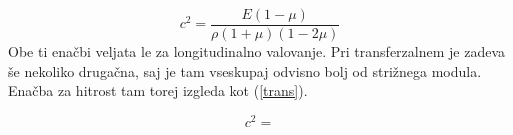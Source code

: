 \documentclass[10pt]{article}
\begin{document}
\begin{equation}
    c^{2} = \frac{E(1-\mu)}{\rho(1+\mu)(1-2\mu)}
    \label{razsežna}
\end{equation}
Obe ti enačbi veljata le za longitudinalno valovanje. Pri transferzalnem je zadeva še nekoliko drugačna, saj je tam vseskupaj odvisno bolj od strižnega modula. Enačba za hitrost tam torej izgleda kot (\ref{trans}).

\begin{equation}
    c^{2} = 
    \label{trans}
\end{equation}
\end{document}
